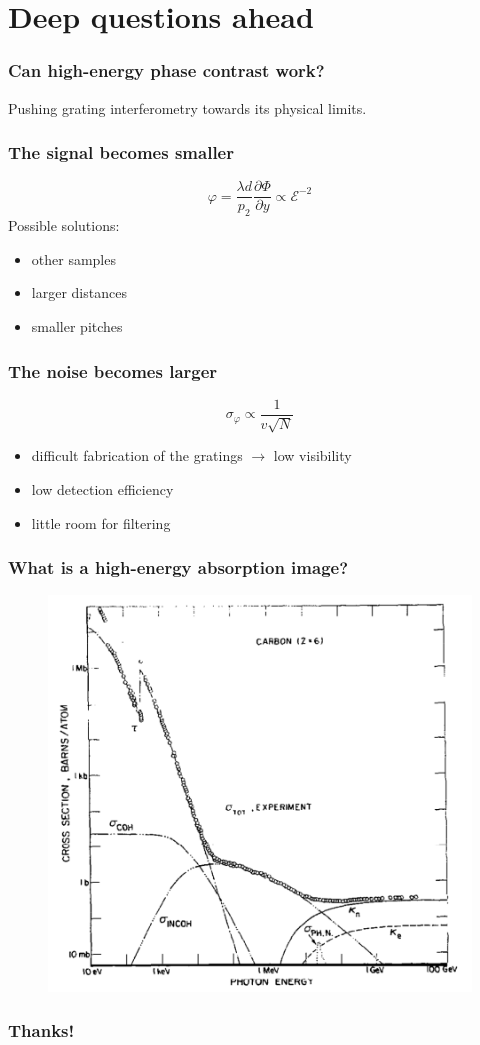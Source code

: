\documentclass[first,firstsupp]{ETHclass}
\begin{document}
    \section{Deep questions ahead}
    \begin{frame}
        \frametitle{Can high-energy phase contrast work?}
        \alert{Pushing grating interferometry towards its physical limits.}
    \end{frame}
    \begin{frame}
        \frametitle{The signal becomes smaller}
        \begin{equation*}
            \varphi = \frac{\lambda d}{p_2} \frac{\partial \Phi}{\partial y}
            \propto \mathcal{E}^{-2}
        \end{equation*}
        Possible solutions:
        \begin{itemize}
            \item other samples 
            \item larger distances 
            \item smaller pitches   
        \end{itemize}
    \end{frame}
    \begin{frame}
        \frametitle{The noise becomes larger}
        \begin{equation*}
            \sigma_\varphi \propto \frac{1}{v\sqrt{N}}
        \end{equation*}
        \begin{itemize}
            \item difficult fabrication of the gratings $\rightarrow$ low visibility
            \item low detection efficiency
            \item little room for filtering
        \end{itemize}
    \end{frame}
    \begin{frame}
        \frametitle{What is a high-energy absorption image?}
        \begin{figure}[h]
            \centering
            \includegraphics[width=.6\textwidth]{carbon_cross_sections}
        \end{figure}
    \end{frame}
    \begin{frame}
        \frametitle{Thanks!}
    \end{frame}
    
\end{document}
